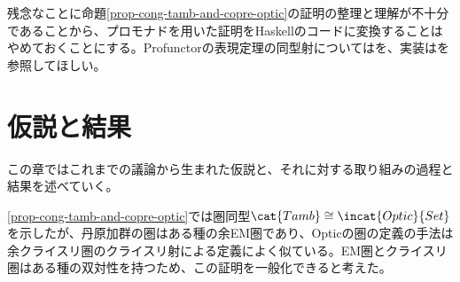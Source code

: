 \documentclass[uplatex,dvipdfmx]{jsarticle}
\begin{document}
  残念なことに命題\ref{prop-cong-tamb-and-copre-optic}の証明の整理と理解が不十分であることから、プロモナドを用いた証明をHaskellのコードに変換することはやめておくことにする。Profunctorの表現定理の同型射については\cite{categories_of_optics}を、実装は\cite{what_you_needa}を参照してほしい。

  \section{仮説と結果}
  この章ではこれまでの議論から生まれた仮説と、それに対する取り組みの過程と結果を述べていく。

  \ref{prop-cong-tamb-and-copre-optic}では圏同型$\cat{Tamb}\cong\incat{Optic}{Set}$を示したが、丹原加群の圏はある種の余EM圏であり、Opticの圏の定義の手法は余クライスリ圏のクライスリ射による定義によく似ている。EM圏とクライスリ圏はある種の双対性を持つため、この証明を一般化できると考えた。
\end{document}
